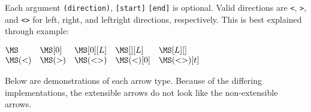 \documentclass{article}
\begin{document}
Each argument \verb+(direction)+, \verb+[start]+ \verb+[end]+ is
optional. Valid directions are \verb+<+, \verb+>+, and \verb+<>+ for left, right,
and leftright directions, respectively. This is best explained through example:

\begin{LTXexample}[pos=b]

$\begin{matrix*}[l]
  \MS & \MS[0] & \MS[0][L] & \MS[][L] & \MS[L][]\\
  \MS(<) & \MS(>) & \MS(<>) & \MS(<)[0] & \MS(<>)[t]
\end{matrix*}$
\end{LTXexample}

Below are demonstrations of each arrow type. Because of the differing
implementations, the extensible arrows do not look like the non-extensible
arrows.\\
\end{document}
